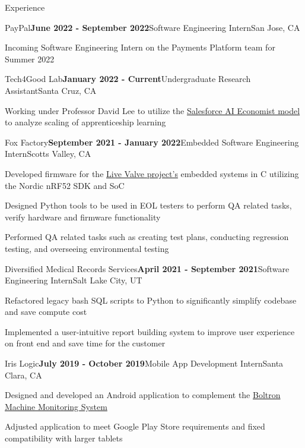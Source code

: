 \documentclass{resume}
\begin{document}
\begin{rSection}{\large Experience}
\begin{rSubsection}{PayPal}{\bf{June 2022 - September 2022}}{Software Engineering Intern}{San Jose, CA }
\item Incoming Software Engineering Intern on the Payments Platform team for Summer 2022 
\end{rSubsection}

\begin{rSubsection}{Tech4Good Lab}{\bf{January 2022 - Current}}{Undergraduate Research Assistant}{Santa Cruz, CA }
\item Working under Professor David Lee to utilize the \href{https://github.com/salesforce/ai-economist}{Salesforce AI Economist model} to analyze scaling of apprenticeship learning
\end{rSubsection}

\begin{rSubsection}{Fox Factory}{\bf{September 2021 - January 2022}}{Embedded Software Engineering Intern}{Scotts Valley, CA }
\item Developed firmware for the \href{https://www.pinkbike.com/news/fox-updates-live-valve-electonic-suspension-for-2022.html}{Live Valve project's} embedded systems in C utilizing the Nordic nRF52 SDK and SoC
\item Designed Python tools to be used in EOL testers to perform QA related tasks, verify hardware and firmware functionality
\item Performed QA related tasks such as creating test plans, conducting regression testing, and overseeing environmental testing
\end{rSubsection}

\begin{rSubsection}{Diversified Medical Records Services}{\bf{April 2021 - September 2021}}{Software Engineering Intern}{Salt Lake City, UT }
\item Refactored legacy bash SQL scripts to Python to significantly simplify codebase and save compute cost
\item Implemented a user-intuitive report building system to improve user experience on front end and save time for the customer
\end{rSubsection}

\begin{rSubsection}{Iris Logic}{\bf{July 2019 - October 2019}}{Mobile App Development Intern}{Santa Clara, CA }
\item Designed and developed an Android application to complement the \href{https://irislogic.com/boltron-machine-monitoring-system/}{Boltron Machine Monitoring System}
\item Adjusted application to meet Google Play Store requirements and fixed compatibility with larger tablets
\end{rSubsection}
\end{rSection}
\end{document}
